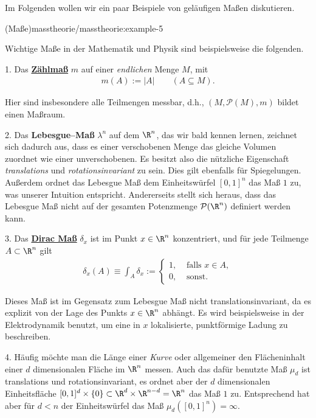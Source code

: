 \documentclass[letterpaper,10pt,english]{jupyterBook}
\begin{document}
\par
Im Folgenden wollen wir ein paar Beispiele von geläufigen Maßen diskutieren.
\begin{example}{(Maße)}{masstheorie/masstheorie:example-5}



\par
Wichtige Maße in der Mathematik und Physik sind beispielsweise die folgenden.

\par
1. Das \href{https://de.wikipedia.org/wiki/Z\%c3\%a4hlma\%c3\%9f\_(Ma\%c3\%9ftheorie)}{\textbf{Zählmaß}} \(m\) auf einer \emph{endlichen} Menge \(M\), mit
\begin{align*}
m(A):=|A|\qquad (A\subseteq M).
\end{align*}
\par
Hier sind insbesondere alle Teilmengen messbar, d.h., \((M, \mathcal{P}(M), m)\) bildet einen Maßraum.

\par
2. Das \textbf{Lebesgue–Maß} \(\lambda^n\) auf dem \(\R^n\), das wir bald kennen lernen, zeichnet sich dadurch aus, dass es einer verschobenen Menge das gleiche Volumen zuordnet wie einer unverschobenen.
Es besitzt also die nützliche Eigenschaft \emph{translations } und \emph{rotationsinvariant} zu sein.
Dies gilt ebenfalls für Spiegelungen.
Außerdem ordnet das Lebesgue Maß dem Einheitswürfel \([0,1]^n\) das Maß \(1\) zu, was unserer Intuition entspricht.
Andererseits stellt sich heraus, dass das Lebesgue Maß nicht auf der gesamten Potenzmenge \(\mathcal{P}(\R^n)\) definiert werden kann.

\par
3. Das \href{https://de.wikipedia.org/wiki/Diracma\%c3\%9f}{\textbf{Dirac Maß}} \(\delta_x\) ist im Punkt \(x \in \R^n\) konzentriert, und für jede Teilmenge \(A\subset\R^n\) gilt
\begin{align*}
\delta_x(A) \equiv \int_A\delta_x := \begin{cases} 1, &  \text{ falls } x \in A,\\ 0, & \text{ sonst}. \end{cases}
\end{align*}
\par
Dieses Maß ist im Gegensatz zum Lebesgue Maß nicht translationsinvariant, da es explizit von der Lage des Punkts \(x\in\R^n\) abhängt.
Es wird beispielsweise in der Elektrodynamik benutzt, um eine in \(x\) lokalisierte, punktförmige Ladung zu beschreiben.

\par
4. Häufig möchte man die Länge einer \emph{Kurve} oder allgemeiner den Flächeninhalt einer \(d\) dimensionalen Fläche im \(\R^n\) messen.
Auch das dafür benutzte Maß \(\mu_d\) ist translations  und rotationsinvariant, es ordnet aber der \(d\) dimensionalen Einheitsfläche \([0,1]^d\times\{0\} \subset\R^d\times\R^{n-d}=\R^n\) das Maß \(1\) zu.
Entsprechend hat aber für \(d<n\) der Einheitswürfel das Maß \(\mu_d([0,1]^n)=\infty\).


\end{example}
\end{document}
